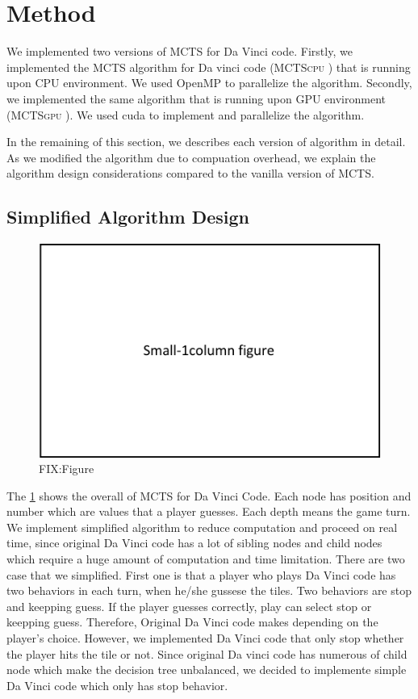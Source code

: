 \documentclass[conference]{IEEEtran}
\newcommand{\cpu} {\textsc{MCTScpu} }
\newcommand{\gpu} {\textsc{MCTSgpu} }
\begin{document}
\section{Method}
We implemented two versions of MCTS for Da Vinci code. 
Firstly, we implemented the MCTS algorithm for Da vinci code (\cpu) that is running upon CPU environment.
We used OpenMP to parallelize the algorithm.
Secondly, we implemented the same algorithm that is running upon GPU environment (\gpu).
We used cuda to implement and parallelize the algorithm.

In the remaining of this section, we describes each version of algorithm in detail. 
As we modified the algorithm due to compuation overhead, we explain the algorithm design considerations compared to the vanilla version of MCTS.

\subsection{Simplified Algorithm Design}

\begin{figure}
\includegraphics{figures/fit_1col.pdf}
\caption{FIX:Figure}
\label{fig:base_tree}
\end{figure}

 The \cref{fig:base_tree} shows the overall of MCTS for Da Vinci Code. 
 Each node has position and number which are values that a player guesses. Each depth means the game turn. 
 We implement simplified algorithm to reduce computation and proceed on real time, since original Da Vinci code has a lot of sibling nodes and child nodes which require a huge amount of computation and time limitation. 
 There are two case that we simplified. 
 First one is that a player who plays Da Vinci code has two behaviors in each turn, when he/she gussese the tiles. 
 Two behaviors are stop and keepping guess. 
 If the player guesses correctly, play can select stop or keepping guess. 
 Therefore, Original Da Vinci code makes depending on the player's choice. 
 However, we implemented Da Vinci code that only stop whether the player hits the tile or not. 
 Since original Da vinci code has numerous of child node which make the decision tree unbalanced, we decided to implemente simple Da Vinci code which only has stop behavior.
 
\end{document}
